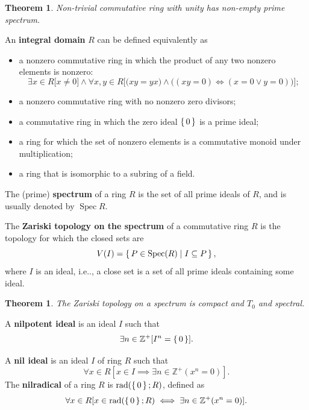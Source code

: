 \documentclass[12pt, letterpaper]{article}
\makeatletter
\newcommand{\inte}{\mathbb{Z}}
\newcommand\ie{i.e\@ifnextchar.{}{.\@}}
\newtheorem{thm}[prop]{Theorem}
\theoremstyle{definition}
\theoremstyle{remark}
\theoremstyle{definition}
\theoremstyle{plain}
\numberwithin{equation}{section}
\makeatother
\begin{document}
	\begin{thm}
		Non-trivial commutative ring with unity
		has non-empty prime spectrum.
	\end{thm}

	\begin{def*}
		An \textbf{integral domain} $R$ can be defined equivalently as
		\begin{itemize}
			\item 
			a nonzero commutative ring
			in which the product of any two nonzero elements is nonzero:
			\[ \exists x\in R\Big[x\ne0\Big] \land \forall x,y\in R\Big[\big(xy=yx\big)\land \big((xy=0 )\iff (x=0\lor y=0)\big)  \Big]; \]
			\item 
			a nonzero commutative ring with no nonzero zero divisors;
			\item a commutative ring in which the zero ideal $\set{0}$ is a prime ideal;
			\item a ring for which the set of nonzero elements is a commutative monoid under multiplication;
			\item a ring that is isomorphic to a subring of a field.
		\end{itemize}
	\end{def*}

	\begin{def*}
		The (prime) \textbf{spectrum} of a ring $R$
		is the set of all prime ideals of $R$, and is usually denoted by $\operatorname {Spec} {R}$.
	\end{def*}
	\begin{def*}
		The \textbf{Zariski topology on the spectrum} of a commutative ring $R$ is the topology for which the closed sets are
		\[V(I)=\set{P\in\operatorname{Spec}(R)|I\subseteq P}, \]
		where $I$ is an ideal, \ie, a close set is a set of all prime ideals containing some ideal.
	\end{def*}
	\begin{thm}
		The Zariski topology on a spectrum is compact and $T_0$ and spectral.
	\end{thm}

	
	\begin{def*}
		A \textbf{nilpotent ideal} is an ideal $I$ such that
		\[ \exists n\in\inte^+[I^n=\set{0}]. \]
	\end{def*}
	
	\begin{def*}
		A \textbf{nil ideal} is an ideal $I$ of ring $R$ such that
		\[ \forall x\in R [x\in I\implies \exists n\in \inte^+(x^n=0) ]. \]
		The \textbf{nilradical} of a ring $R$ is $\operatorname{rad}(\set{0};R)$, defined as
		\[ \forall x\in R [x\in \operatorname{rad}(\set{0};R)\iff \exists n\in \inte^+(x^n=0) ]. \]
		\[  \]
	\end{def*}
	
\end{document}
